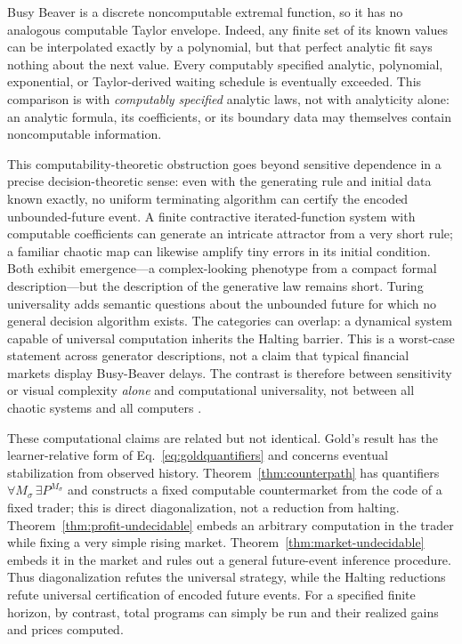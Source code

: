 \documentclass[aps,pra,reprint,superscriptaddress,amsmath,amssymb,floatfix]{revtex4-2}
\theoremstyle{plain}
\theoremstyle{definition}
\theoremstyle{remark}
\begin{document}
Busy Beaver is a discrete noncomputable extremal function, so it has no
analogous computable Taylor envelope. Indeed, any finite set of its known
values can be interpolated exactly by a polynomial, but that perfect analytic
fit says nothing about the next value. Every computably specified analytic,
polynomial, exponential, or Taylor-derived waiting schedule is eventually
exceeded. This comparison is with \emph{computably specified} analytic laws,
not with analyticity alone: an analytic formula, its coefficients, or its
boundary data may themselves contain noncomputable information.

This computability-theoretic obstruction goes beyond sensitive dependence in a
precise decision-theoretic sense: even with the generating rule and initial
data known exactly, no uniform terminating algorithm can certify the encoded
unbounded-future event. A finite contractive iterated-function system with
computable coefficients can generate an intricate attractor from a very short
rule; a familiar chaotic map can likewise amplify tiny errors in its initial
condition. Both exhibit emergence---a complex-looking phenotype from a compact
formal description---but the description of the generative law remains short.
Turing universality adds semantic questions about the unbounded future for
which no general decision algorithm exists. The categories can overlap: a
dynamical system capable of universal computation inherits the Halting
barrier. This is a worst-case statement across generator descriptions, not a
claim that typical financial markets display Busy-Beaver delays. The contrast
is therefore between sensitivity or visual complexity \emph{alone} and
computational universality, not between all chaotic systems and all computers
\cite{barnsley:88,moore,calude:037103}.

These computational claims are related but not identical. Gold's result has
the learner-relative form of Eq.~\eqref{eq:goldquantifiers} and concerns
eventual stabilization from observed history.
Theorem~\ref{thm:counterpath} has quantifiers
\(\forall M_\sigma\,\exists P^{M_\sigma}\) and constructs a fixed computable
countermarket from the code of a fixed trader; this is direct diagonalization,
not a reduction from halting. Theorem~\ref{thm:profit-undecidable} embeds an
arbitrary computation in the trader while fixing a very simple rising market.
Theorem~\ref{thm:market-undecidable} embeds it in the market and rules out a
general future-event inference procedure. Thus diagonalization refutes the
universal strategy, while the Halting reductions refute universal
certification of encoded future events. For a specified finite horizon, by
contrast, total programs can simply be run and their realized gains and prices
computed.
\end{document}
